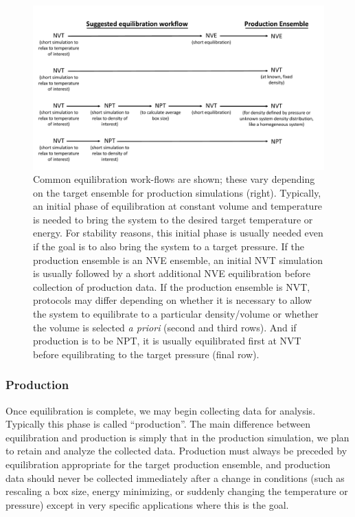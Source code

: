 \documentclass[9pt,bestpractices]{livecoms}
\begin{document}
\begin{figure}[h]
\centering
\includegraphics[width=\linewidth]{Equilibration_Workflow.pdf}
\caption{Common equilibration work-flows are shown; these vary depending on the target ensemble for production simulations (right).
Typically, an initial phase of equilibration at constant volume and temperature is needed to bring the system to the desired target temperature or energy.
For stability reasons, this initial phase is usually needed even if the goal is to also bring the system to a target pressure.
If the production ensemble is an NVE ensemble, an initial NVT simulation is usually followed by a short additional NVE equilibration before collection of production data.
If the production ensemble is NVT, protocols may differ depending on whether it is necessary to allow the system to equilibrate to a particular density/volume or whether the volume is selected \emph{a priori} (second and third rows).
And if production is to be NPT, it is usually equilibrated first at NVT before equilibrating to the target pressure (final row).} 
\label{eqworkflow}
\end{figure}

\subsubsection{Production}

Once equilibration is complete, we may begin collecting data for analysis.
Typically this phase is called ``production''.
The main difference between equilibration and production is simply that in the production simulation, we plan to retain and analyze the collected data.
Production must always be preceded by equilibration appropriate for the target production ensemble, and production data should never be collected immediately after a change in conditions (such as rescaling a box size, energy minimizing, or suddenly changing the temperature or pressure) except in very specific applications where this is the goal.
\end{document}
